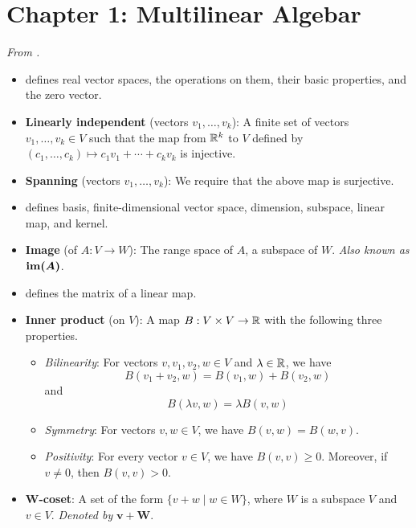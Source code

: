 \documentclass[../notes.tex]{subfiles}
\begin{document}
\section{Chapter 1: Multilinear Algebar}
\emph{From \textcite{bib:DifferentialForms}.}
\begin{itemize}
    \item {}\textcite{bib:DifferentialForms} defines real vector spaces, the operations on them, their basic properties, and the zero vector.
    \item \textbf{Linearly independent} (vectors $v_1,\dots,v_k$): A finite set of vectors $v_1,\dots,v_k\in V$ such that the map from $\mathbb{R}^k$ to $V$ defined by $(c_1,\dots,c_k)\mapsto c_1v_1+\cdots+c_kv_k$ is injective.
    \item \textbf{Spanning} (vectors $v_1,\dots,v_k$): We require that the above map is surjective.
    \item \textcite{bib:DifferentialForms} defines basis, finite-dimensional vector space, dimension, subspace, linear map, and kernel.
    \item \textbf{Image} (of $A:V\to W$): The range space of $A$, a subspace of $W$. \emph{Also known as} $\bm{\im(A)}$.
    \item \textcite{bib:DifferentialForms} defines the matrix of a linear map.
    \item \textbf{Inner product} (on $V$): A map $B:V\times V\to\mathbb{R}$ with the following three properties.
    \begin{itemize}
        \item \emph{Bilinearity}: For vectors $v,v_1,v_2,w\in V$ and $\lambda\in\mathbb{R}$, we have
        \begin{equation*}
            B(v_1+v_2,w) = B(v_1,w)+B(v_2,w)
        \end{equation*}
        and
        \begin{equation*}
            B(\lambda v,w) = \lambda B(v,w)
        \end{equation*}
        \item \emph{Symmetry}: For vectors $v,w\in V$, we have $B(v,w)=B(w,v)$.
        \item \emph{Positivity}: For every vector $v\in V$, we have $B(v,v)\geq 0$. Moreover, if $v\neq 0$, then $B(v,v)>0$.
    \end{itemize}
    \item \textbf{$\bm{W}$-coset}: A set of the form $\{v+w\mid w\in W\}$, where $W$ is a subspace $V$ and $v\in V$. \emph{Denoted by} $\bm{v+W}$.
    \begin{itemize}

\end{itemize}
\end{itemize}
\end{document}
